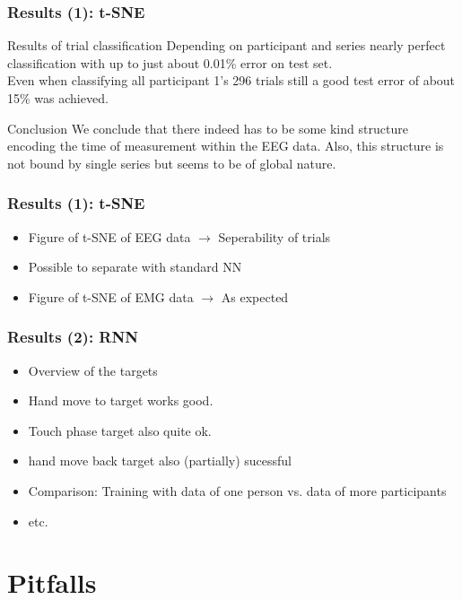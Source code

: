 \documentclass{beamer}
\begin{document}
\begin{frame}
	\frametitle{Results (1): t-SNE}
	
	\begin{block}{Results of trial classification}
		Depending on participant and series nearly perfect classification with up to just about 0.01\% error on test set.\\
		Even when classifying all participant 1's 296 trials still a good test error of about 15\% was achieved.
	\end{block}
	
	\begin{block}{Conclusion}
		We conclude that there indeed has to be some kind structure encoding the time of measurement within the EEG data.
		Also, this structure is not bound by single series but seems to be of global nature.
	\end{block}
\end{frame}

		
		
		
\begin{frame}
	\frametitle{Results (1): t-SNE}
	\begin{itemize}
		\item Figure of t-SNE of EEG data $\rightarrow$ Seperability of trials
		\item Possible to separate with standard NN
		\item Figure of t-SNE of EMG data $\rightarrow$ As expected
	\end{itemize}
\end{frame}

\begin{frame}
	\frametitle{Results (2): RNN}
	\begin{itemize}
		\item Overview of the targets
		\item Hand move to target works good.
		\item Touch phase target also quite ok.
		\item hand move back target also (partially) sucessful
		\item Comparison: Training with data of one person vs. data of more participants
		\item etc.
	\end{itemize}
\end{frame}

\section{Pitfalls}
\end{document}
